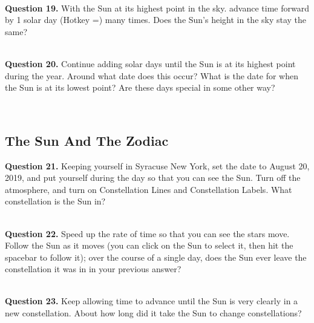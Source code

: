 \documentclass[11pt]{article}
\begin{document}
\hrulefill\\

\textbf{Question 19.} With the Sun at its highest point in the sky. advance time forward by 1 solar day (Hotkey =) many times. Does the Sun's height in the sky stay the same?\\
\vspace*{1.5cm}

\hrulefill\\

\textbf{Question 20.} Continue adding solar days until the Sun is at its highest point during the year. Around what date does this occur? What is the date for when the Sun is at its lowest point? Are these days special in some other way?\\
\vspace*{1.5cm}

\hrulefill\\

\newpage

\subsection{The Sun And The Zodiac}

\textbf{Question 21.} Keeping yourself in Syracuse New York, set the date to August 20, 2019, and put yourself during the day so that you can see the Sun. Turn off the atmosphere, and turn on Constellation Lines and Constellation Labels. What constellation is the Sun in? \\
\vspace*{1.5cm}

\hrulefill\\

\textbf{Question 22.} Speed up the rate of time so that you can see the stars move. Follow the Sun as it moves (you can click on the Sun to select it, then hit the spacebar to follow it); over the course of a single day, does the Sun ever leave the constellation it was in in your previous answer? \\
\vspace*{1.5cm}

\hrulefill\\

\textbf{Question 23.} Keep allowing time to advance until the Sun is very clearly in a new constellation. About how long did it take the Sun to change constellations? \\
\vspace*{1.5cm}
\end{document}
